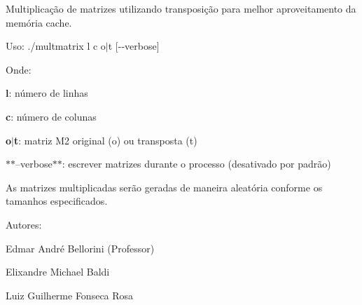 Multiplicação de matrizes utilizando transposição para melhor aproveitamento da memória cache.

Uso\+: {\ttfamily ./multmatrix l c o$\vert$t \mbox{[}-\/-\/verbose\mbox{]}}

Onde\+:

{\bfseries l}\+: número de linhas

{\bfseries c}\+: número de colunas

{\bfseries o$\vert$t}\+: matriz M2 original (o) ou transposta (t)

$\ast$$\ast$--verbose$\ast$$\ast$\+: escrever matrizes durante o processo (desativado por padrão)

As matrizes multiplicadas serão geradas de maneira aleatória conforme os tamanhos especificados.

Autores\+:


\begin{DoxyItemize}
\item Edmar André Bellorini (Professor)
\item Elixandre Michael Baldi
\item Luiz Guilherme Fonseca Rosa 
\end{DoxyItemize}